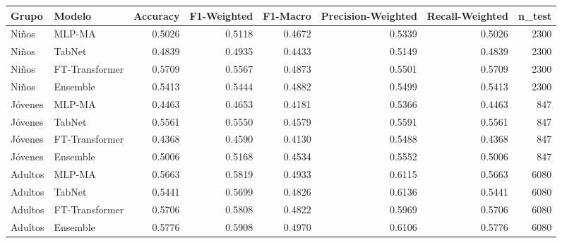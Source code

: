 \begin{tabular}{llrrrrrr}
\toprule
Grupo & Modelo & Accuracy & F1-Weighted & F1-Macro & Precision-Weighted & Recall-Weighted & n_test \\
\midrule
Niños & MLP-MA & 0.5026 & 0.5118 & 0.4672 & 0.5339 & 0.5026 & 2300 \\
Niños & TabNet & 0.4839 & 0.4935 & 0.4433 & 0.5149 & 0.4839 & 2300 \\
Niños & FT-Transformer & 0.5709 & 0.5567 & 0.4873 & 0.5501 & 0.5709 & 2300 \\
Niños & Ensemble & 0.5413 & 0.5444 & 0.4882 & 0.5499 & 0.5413 & 2300 \\
Jóvenes & MLP-MA & 0.4463 & 0.4653 & 0.4181 & 0.5366 & 0.4463 & 847 \\
Jóvenes & TabNet & 0.5561 & 0.5550 & 0.4579 & 0.5591 & 0.5561 & 847 \\
Jóvenes & FT-Transformer & 0.4368 & 0.4590 & 0.4130 & 0.5488 & 0.4368 & 847 \\
Jóvenes & Ensemble & 0.5006 & 0.5168 & 0.4534 & 0.5552 & 0.5006 & 847 \\
Adultos & MLP-MA & 0.5663 & 0.5819 & 0.4933 & 0.6115 & 0.5663 & 6080 \\
Adultos & TabNet & 0.5441 & 0.5699 & 0.4826 & 0.6136 & 0.5441 & 6080 \\
Adultos & FT-Transformer & 0.5706 & 0.5808 & 0.4822 & 0.5969 & 0.5706 & 6080 \\
Adultos & Ensemble & 0.5776 & 0.5908 & 0.4970 & 0.6106 & 0.5776 & 6080 \\
\bottomrule
\end{tabular}
